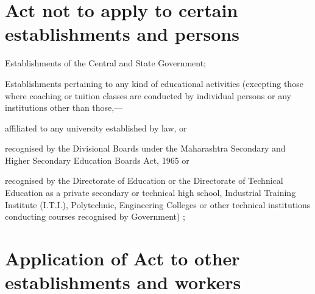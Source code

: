 \documentclass[gaz8,ordinance]{mhact}
\begin{document}
        \section{Act not to apply to certain establishments and persons} 
        
      \begin{subsectionlist}
    
    \item Establishments of the Central and State Government;
    \item Establishments pertaining to any kind of educational activities 
(excepting those where coaching or tuition classes are conducted by 
individual persons or any institutions other than those,---
      \begin{clause}
    
    \item affiliated to any university established by law, or
    \item recognised by the Divisional Boards under the Maharashtra 
Secondary and Higher Secondary Education Boards Act, 1965 
   or
    \item recognised by the Directorate of Education or the 
Directorate of Technical Education as a private secondary or 
technical high school, Industrial Training Institute (I.T.I.), 
Polytechnic, Engineering Colleges or other technical institutions 
conducting courses recognised by Government) ;
       \end{clause}
    
       \end{subsectionlist}
    
        \section{Application of Act to other establishments and workers} 
        
\end{document}
